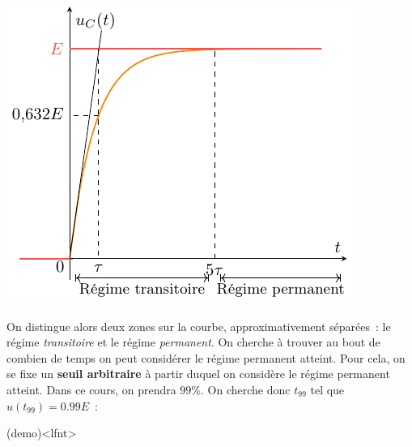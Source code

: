 \documentclass[../../main/main.tex]{subfiles}
\begin{document}
\begin{tcbraster}[raster columns=2, raster equal height=rows]
\begin{tcb}
{		}{
			\includegraphics[width=\linewidth]{carac_rc-tau}
		}
	\end{tcb}
\end{tcbraster}
On distingue alors deux zones sur la courbe, approximativement séparées~: le
régime \textit{transitoire} et le régime \textit{permanent}. On cherche à
trouver au bout de combien de temps on peut considérer le régime permanent
atteint.
\smallbreak
Pour cela, on se fixe un \textbf{seuil arbitraire} à partir duquel on considère
le régime permanent atteint. Dans ce cours, on prendra $99\%$. On cherche donc
$t_{99}$ tel que $u(t_{99}) = \num{0.99}E$~:
\begin{tcb}(demo)<lfnt>{}
	\vspace{-15pt}
\end{tcb}
\end{document}
